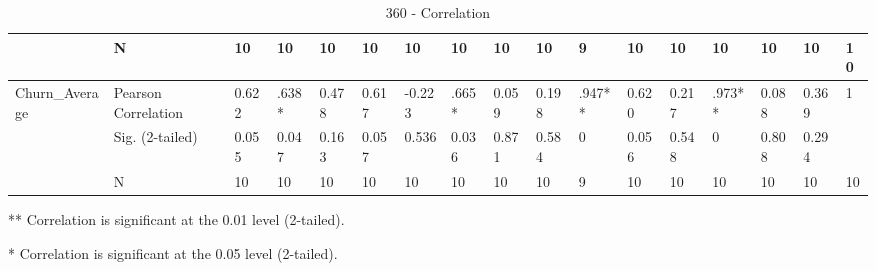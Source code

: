 \documentclass[UKenglish]{ifimaster}  %
\begin{document}
\begin{table}[htbp]
\begin{adjustwidth}{-2cm}{}
{\begin{tabular}{ | l | l | l | l | l | l | l | l | l | l | l | l | l | l | l | l | l | }
	 & N & 10 & 10 & 10 & 10 & 10 & 10 & 10 & 10 & 9 & 10 & 10 & 10 & 10 & 10 & 10 \\ \hline
	Churn\_Average & Pearson Correlation & 0.622 & .638* & 0.478 & 0.617 & -0.223 & .665* & 0.059 & 0.198 & .947** & 0.620 & 0.217 & .973** & 0.088 & 0.369 & 1 \\ \hline
	 & Sig. (2-tailed) & 0.055 & 0.047 & 0.163 & 0.057 & 0.536 & 0.036 & 0.871 & 0.584 & 0 & 0.056 & 0.548 & 0 & 0.808 & 0.294 &  \\ \hline
	 & N & 10 & 10 & 10 & 10 & 10 & 10 & 10 & 10 & 9 & 10 & 10 & 10 & 10 & 10 & 10 \\ \hline
	 \end{tabular}
 }
  \centerline{  ** Correlation is significant at the 0.01 level (2-tailed).}
    \centerline {* Correlation is significant at the 0.05 level (2-tailed).}
      \caption{360 - Correlation}
  \label{tab:addlabelSwag}%
 \end{adjustwidth}
\end{table}%
\end{document}
